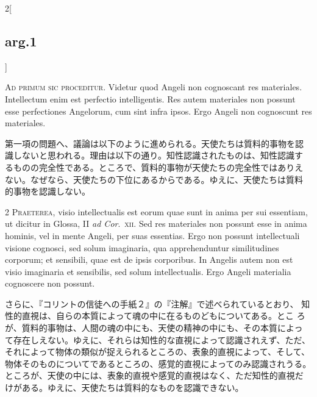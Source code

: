 \documentclass[paper=a4paper,fontsize=10pt,jafontsize=9pt,titlepage]{jlreq}
\begin{document}
\begin{paracol}{2}[\subsection{arg.1}]

{\huge A}{\scshape d primum sic proceditur}. Videtur quod Angeli non
cognoscant res materiales. Intellectum enim est perfectio
intelligentis. Res autem materiales non possunt esse perfectiones
Angelorum, cum sint infra ipsos. Ergo Angeli non cognoscunt res
materiales.

\switchcolumn

第一項の問題へ、議論は以下のように進められる。天使たちは質料的事物を認
識しないと思われる。理由は以下の通り。知性認識されたものは、知性認識す
るものの完全性である。ところで、質料的事物が天使たちの完全性ではありえ
ない。なぜなら、天使たちの下位にあるからである。ゆえに、天使たちは質料
的事物を認識しない。


{\scshape 2 Praeterea}, visio intellectualis est eorum quae sunt in
anima per sui essentiam, ut dicitur in Glossa, II {\itshape ad
Cor}.~{\scshape xii}. Sed res materiales non possunt esse in anima
hominis, vel in mente Angeli, per suas essentias. Ergo non possunt
intellectuali visione cognosci, sed solum imaginaria, qua
apprehenduntur similitudines corporum; et sensibili, quae est de ipsis
corporibus. In Angelis autem non est visio imaginaria et sensibilis,
sed solum intellectualis. Ergo Angeli materialia cognoscere non
possunt.

\switchcolumn

さらに、『コリントの信徒への手紙２』の『注解』で述べられているとおり、
知性的直視は、自らの本質によって魂の中に在るものどもについてある。とこ
ろが、質料的事物は、人間の魂の中にも、天使の精神の中にも、その本質によっ
て存在しえない。ゆえに、それらは知性的な直視によって認識されえず、ただ、
それによって物体の類似が捉えられるところの、表象的直視によって、そして、
物体そのものについてであるところの、感覚的直視によってのみ認識されうる。
ところが、天使の中には、表象的直視や感覚的直視はなく、ただ知性的直視だ
けがある。ゆえに、天使たちは質料的なものを認識できない。



\end{paracol}
\end{document}
